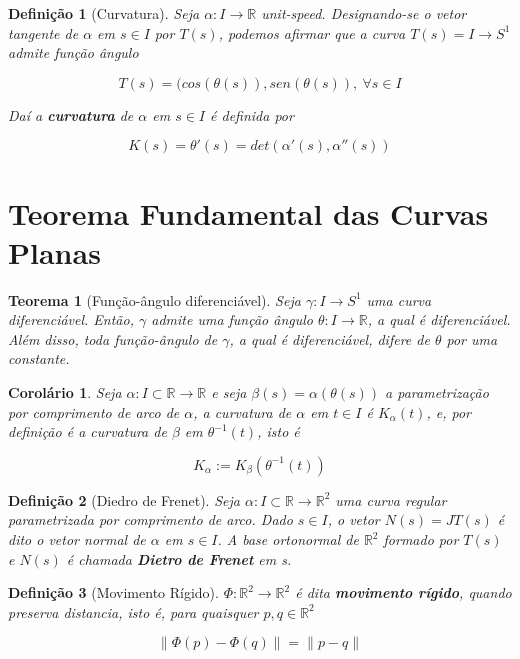 \documentclass{article}
\newtheorem{theorem}{Teorema}
\newtheorem{corollary}{Corolário}[theorem]
\newtheorem{definition}{Definição}
\begin{document}
\begin{definition}[Curvatura]
Seja $\alpha: I \rightarrow \mathbb{R}$ unit-speed. Designando-se o vetor tangente de $\alpha$ em $s \in I$ por $T(s)$, podemos afirmar que a curva $T(s) = I \rightarrow S^1$ admite função ângulo

$$T(s) = (cos(\theta(s)), sen(\theta(s)),\ \forall s \in I$$

Daí a \textbf{curvatura} de $\alpha$ em $s \in I$ é definida por

$$K(s) = \theta'(s) = det(\alpha'(s), \alpha''(s))$$
\end{definition}

\section*{Teorema Fundamental das Curvas Planas}
\label{s4}

\begin{theorem}[Função-ângulo diferenciável]
Seja $\gamma: I \rightarrow S^1$ uma curva diferenciável. Então, $\gamma$ admite uma função ângulo $\theta: I \rightarrow \mathbb{R}$, a qual é diferenciável. Além disso, toda função-ângulo de $\gamma$, a qual é diferenciável, difere de $\theta$ por uma constante.
\end{theorem}

\begin{corollary}
Seja $\alpha : I \subset \mathbb{R} \rightarrow \mathbb{R}$ e seja $\beta(s) = \alpha(\theta(s))$ a parametrização por comprimento de arco de $\alpha$, a curvatura de $\alpha$ em $t \in I$ é $K_\alpha(t)$, e, por definição é a curvatura de $\beta$ em $\theta^{-1}(t)$, isto é

$$K_\alpha := K_\beta(\theta^{-1}(t))$$
\end{corollary}

\begin{definition}[Diedro de Frenet]
Seja $\alpha: I \subset \mathbb{R} \rightarrow \mathbb{R}^2$ uma curva regular parametrizada por comprimento de arco. Dado $s \in I$, o vetor $N(s) = JT(s)$ é dito o vetor normal de $\alpha$ em $s \in I$. A base ortonormal de $\mathbb{R}^2$ formado por $T(s)$ e $N(s)$ é chamada \textbf{Dietro de Frenet} em s.
\end{definition}

\begin{definition}[Movimento Rígido]
$\Phi: \mathbb{R}^2 \rightarrow \mathbb{R}^2$ é dita \textbf{movimento rígido}, quando preserva distancia, isto é, para quaisquer $p, q \in \mathbb{R}^2$

$$\| \Phi(p) - \Phi(q) \| = \| p - q \|$$
\end{definition}
\end{document}
